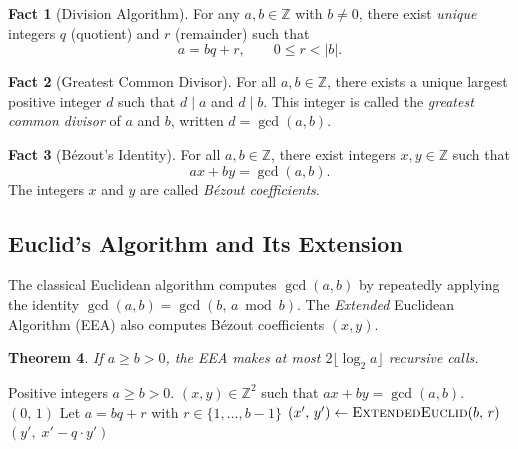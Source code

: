 \documentclass[11pt]{article}
\theoremstyle{plain}
\newtheorem{theorem}{Theorem}[section]
\theoremstyle{definition}
\newtheorem{fact}[theorem]{Fact}
\newcommand{\Z}{\mathbb{Z}}
\begin{document}
\begin{fact}[Division Algorithm]
  \label{fact:division}
  For any $a, b \in \Z$ with $b \neq 0$, there exist \emph{unique}
  integers $q$ (quotient) and $r$ (remainder) such that
  \[
    a = b q + r, \qquad 0 \le r < |b|.
  \]
\end{fact}

\begin{fact}[Greatest Common Divisor]
  \label{fact:gcd}
  For all $a, b \in \Z$, there exists a unique largest positive integer
  $d$ such that $d \mid a$ and $d \mid b$.  This integer is called the
  \emph{greatest common divisor} of $a$ and $b$, written
  $d = \gcd(a, b)$.
\end{fact}

\begin{fact}[B\'ezout's Identity]
  \label{fact:bezout}
  For all $a, b \in \Z$, there exist integers $x, y \in \Z$ such that
  \[
    ax + by = \gcd(a, b).
  \]
  The integers $x$ and $y$ are called \emph{B\'ezout coefficients}.
\end{fact}

\subsection{Euclid's Algorithm and Its Extension}

The classical Euclidean algorithm computes $\gcd(a, b)$ by repeatedly
applying the identity $\gcd(a, b) = \gcd(b,\, a \bmod b)$.  The
\emph{Extended} Euclidean Algorithm (EEA) also computes B\'ezout
coefficients $(x, y)$.

\begin{theorem}
  If $a \ge b > 0$, the EEA makes at most $2\lfloor\log_2 a\rfloor$
  recursive calls.
\end{theorem}

\begin{algorithm}
\caption{$\textsc{ExtendedEuclid}(a,\, b)$}
\begin{algorithmic}[1]
\Require Positive integers $a \ge b > 0$.
\Ensure $(x, y) \in \Z^2$ such that $ax + by = \gcd(a, b)$.
  \State \Return $(0,\, 1)$
\Else
  \State Let $a = bq + r$ with $r \in \{1, \ldots, b-1\}$
  \State $(x',\, y') \gets \textsc{ExtendedEuclid}(b,\, r)$
  \State \Return $(y',\; x' - q \cdot y')$
\EndIf
\end{algorithmic}
\end{algorithm}
\end{document}
